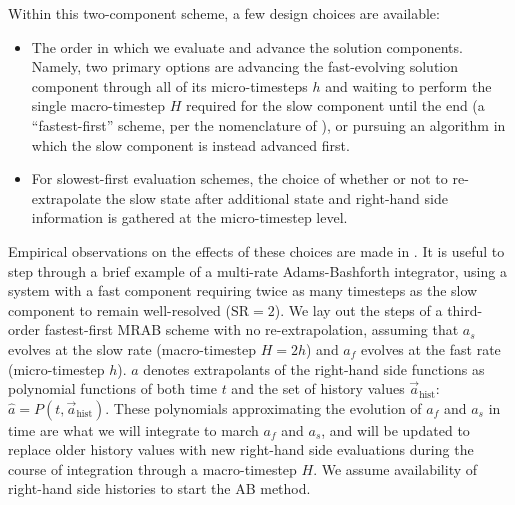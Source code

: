 Within this two-component scheme, a few design choices are available:
\begin{itemize}
\item The order in which we evaluate and advance the solution components.
	Namely, two primary options are advancing the fast-evolving solution
	component through all of its micro-timesteps $h$ and waiting to perform
	the single macro-timestep $H$ required for the slow component until the
	end (a ``fastest-first'' scheme, per the nomenclature of
	\cite{gear1984multirate}), or pursuing an algorithm in which the slow
	component is instead advanced first.
\item For slowest-first evaluation schemes, the choice of whether or not to
	re-extrapolate the slow state after additional state and right-hand
	side information is gathered at the micro-timestep level.
\end{itemize}
Empirical observations on the effects of these choices are made
in \cite{klockner2010high}.  It is useful to step through a brief example
of a multi-rate Adams-Bashforth integrator, using a system with a
fast component requiring twice as many timesteps as the slow component
to remain well-resolved ($\text{SR}=2$).  We lay out the steps of a third-order
fastest-first MRAB scheme with no re-extrapolation, assuming that $a_{s}$
evolves at the slow rate (macro-timestep $H = 2h$) and $a_{f}$ evolves at the
fast rate (micro-timestep $h$).  $\hat{a}$ denotes extrapolants of the
right-hand side functions as polynomial functions of both time $t$ and the set
of history values $\vec{a}_{\text{hist}}$: $\hat{a} = P(t,
\vec{a}_{\text{hist}})$.  These polynomials approximating the evolution of
$a_{f}$ and $a_{s}$ in time are what we will integrate to march $a_{f}$ and
$a_{s}$, and will be updated to replace older history values with new
right-hand side evaluations during the course of integration through a
macro-timestep $H$.  We assume availability of right-hand side histories to
start the AB method.
